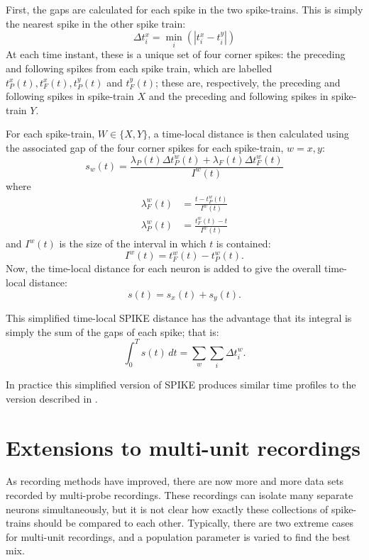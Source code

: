 First, the gaps are calculated for each spike in the two spike-trains.  This is simply the nearest spike in the other spike train:
\begin{equation}
\Delta t_i^x = \min_i ( | t_i^x - t_i^y |)
\end{equation}
At each time instant, these is a unique set of four corner spikes: the preceding and following spikes from each spike train, which are labelled $t_P^x(t), t_F^x(t), t_P^y(t)$ and  $t_F^y(t)$; these are, respectively, the preceding and following spikes in spike-train $X$ and the preceding and following spikes in spike-train $Y$.

For each spike-train, $W\in \{ X, Y \}$, a time-local distance is then calculated using the associated gap of the four corner spikes for each spike-train, $w=x,y$:
\begin{equation}
s_w(t) = \frac{\lambda_P(t) \Delta t_P^w(t) + \lambda_F(t)\Delta t_F^w(t)}{I^w(t)}
\end{equation}
where
\begin{equation}
\begin{split}
\lambda_F^w(t) &= \frac{t- t_P^w(t)}{I^w(t)}\\ \lambda_P^w(t) &= \frac{ t_F^w(t) - t}{I^w(t)}
\end{split}
\end{equation}
and $I^w(t)$ is the size of the interval in which $t$ is contained:
\begin{equation}
I^w(t) = t_F^w(t) - t_P^w(t).
\end{equation}
Now, the time-local distance for each neuron is added to give the overall time-local distance:
\begin{equation}
s(t) = s_x(t) + s_y(t).
\end{equation}

This simplified time-local SPIKE distance has the advantage that its integral is simply the sum of the gaps of each spike; that is:
\begin{equation}
\int_0^T s(t)\, dt = \sum_w \sum_i \Delta t_i^w.
\end{equation}

In practice this simplified version of SPIKE produces similar time profiles to the version described in \citep{KreuzEtAl2011a}.


\section{Extensions to multi-unit recordings}
As recording methods have improved, there are now more and more data sets recorded by multi-probe recordings.  These recordings can isolate many separate neurons simultaneously, but it is not clear how exactly these collections of spike-trains should be compared to each other.  Typically, there are two extreme cases for multi-unit recordings, and a population parameter is varied to find the best mix.  

